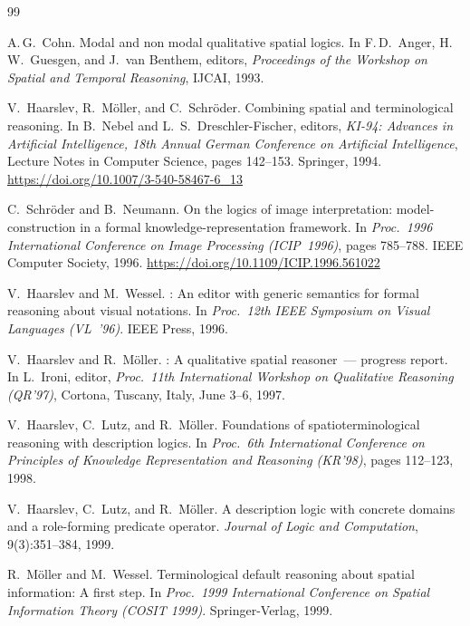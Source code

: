 \documentclass[
]{ceurart}
\theoremstyle{definition}
\begin{document}
\begin{thebibliography}{99}

A.\,G.\ Cohn.
\newblock Modal and non modal qualitative spatial logics.
\newblock In F.\,D.\ Anger, H.\,W.\ Guesgen, and J.\ van Benthem, editors,
  \emph{Proceedings of the Workshop on Spatial and Temporal Reasoning},
  IJCAI, 1993.

 V.\ Haarslev, R.\ M\"oller, and
  C.\ Schr\"oder.  \newblock Combining spatial and terminological
  reasoning.  \newblock In B.\ Nebel and L.\ S.\ Dreschler-Fischer,
  editors, \emph{KI-94: Advances in Artificial Intelligence, 18th
  Annual German Conference on Artificial Intelligence}, Lecture Notes
  in Computer Science, pages 142--153. Springer, 1994.  \newblock
  \url{https://doi.org/10.1007/3-540-58467-6_13}

 C.\ Schr\"oder and B.\ Neumann.
  \newblock On the logics of image interpretation: model-construction
  in a formal knowledge-representation framework.  \newblock In
  \emph{Proc.\ 1996 International Conference on Image Processing
  (ICIP~1996)}, pages 785--788. IEEE Computer Society, 1996.
  \newblock \url{https://doi.org/10.1109/ICIP.1996.561022}

 V.\ Haarslev and M.\ Wessel.
  : An editor with generic semantics for formal
  reasoning about visual notations.  \newblock In \emph{Proc.\ 12th
  IEEE Symposium on Visual Languages (VL~'96)}. IEEE Press, 1996.

 V.\ Haarslev and R.\ M\"oller.
  : A qualitative spatial reasoner~--- progress
  report.  \newblock In L.\ Ironi, editor, \emph{Proc.\ 11th
  International Workshop on Qualitative Reasoning (QR'97)}, Cortona,
  Tuscany, Italy, June 3--6, 1997.

 V.\ Haarslev, C.\ Lutz, and
  R.\ M\"oller.  \newblock Foundations of spatioterminological
  reasoning with description logics.  \newblock In \emph{Proc.\ 6th
  International Conference on Principles of Knowledge Representation
  and Reasoning (KR'98)}, pages 112--123, 1998.

 V.\ Haarslev, C.\ Lutz, and
  R.\ M\"oller.  \newblock A description logic with concrete domains
  and a role-forming predicate operator.  \newblock \emph{Journal of
  Logic and Computation}, 9(3):351--384, 1999.

 R.\ M\"oller and M.\ Wessel.  \newblock
  Terminological default reasoning about spatial information: A first
  step.  \newblock In \emph{Proc.\ 1999 International Conference on
  Spatial Information Theory (COSIT 1999)}. Springer-Verlag, 1999.


\end{thebibliography}
\end{document}
